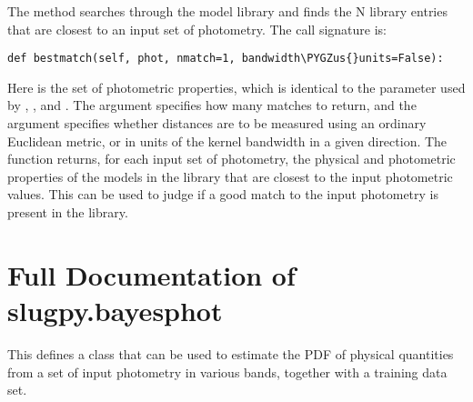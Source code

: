 \documentclass[letterpaper,10pt,english]{sphinxmanual}
\def\PYGZus{\char`\_}
\begin{document}
The  method searches through the model library and finds the N library entries that are closest to an input set of photometry. The call signature is:

\begin{Verbatim}[commandchars=\\\{\}]
def bestmatch(self, phot, nmatch=1, bandwidth\PYGZus{}units=False):
\end{Verbatim}

Here  is the set of photometric properties, which is identical to the  parameter used by , , and . The argument  specifies how many matches to return, and the argument  specifies whether distances are to be measured using an ordinary Euclidean metric, or in units of the kernel bandwidth in a given direction. The function returns, for each input set of photometry, the physical and photometric properties of the  models in the library that are closest to the input photometric values. This can be used to judge if a good match to the input photometry is present in the library.


\section{Full Documentation of slugpy.bayesphot}
\label{bayesphot:module-slugpy.bayesphot.bp}\label{bayesphot:ssec-slugpy-bayesphot}\label{bayesphot:full-documentation-of-slugpy-bayesphot}
This defines a class that can be used to estimate the PDF of physical
quantities from a set of input photometry in various bands, together
with a training data set.
\end{document}
